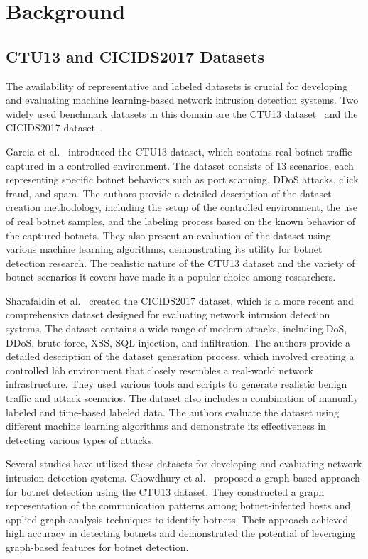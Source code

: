 \chapter{Background}

\section{CTU13 and CICIDS2017 Datasets}

The availability of representative and labeled datasets is crucial for developing and evaluating machine learning-based network intrusion detection systems. Two widely used benchmark datasets in this domain are the CTU13 dataset~\cite{garcia2014empirical} and the CICIDS2017 dataset~\cite{sharafaldin2018toward}.

Garcia et al.~\cite{garcia2014empirical} introduced the CTU13 dataset, which contains real botnet traffic captured in a controlled environment. The dataset consists of 13 scenarios, each representing specific botnet behaviors such as port scanning, DDoS attacks, click fraud, and spam. The authors provide a detailed description of the dataset creation methodology, including the setup of the controlled environment, the use of real botnet samples, and the labeling process based on the known behavior of the captured botnets. They also present an evaluation of the dataset using various machine learning algorithms, demonstrating its utility for botnet detection research. The realistic nature of the CTU13 dataset and the variety of botnet scenarios it covers have made it a popular choice among researchers.

Sharafaldin et al.~\cite{sharafaldin2018toward} created the CICIDS2017 dataset, which is a more recent and comprehensive dataset designed for evaluating network intrusion detection systems. The dataset contains a wide range of modern attacks, including DoS, DDoS, brute force, XSS, SQL injection, and infiltration. The authors provide a detailed description of the dataset generation process, which involved creating a controlled lab environment that closely resembles a real-world network infrastructure. They used various tools and scripts to generate realistic benign traffic and attack scenarios. The dataset also includes a combination of manually labeled and time-based labeled data. The authors evaluate the dataset using different machine learning algorithms and demonstrate its effectiveness in detecting various types of attacks.

Several studies have utilized these datasets for developing and evaluating network intrusion detection systems. Chowdhury et al.~\cite{chowdhury2017botnet} proposed a graph-based approach for botnet detection using the CTU13 dataset. They constructed a graph representation of the communication patterns among botnet-infected hosts and applied graph analysis techniques to identify botnets. Their approach achieved high accuracy in detecting botnets and demonstrated the potential of leveraging graph-based features for botnet detection.

